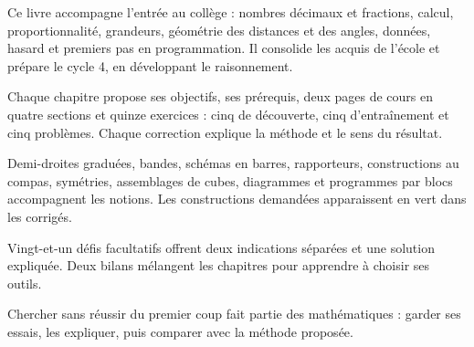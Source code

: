 \clearpage\thispagestyle{otFront}\label{avant-propos}\fontsize{11}{15}\selectfont

Ce livre accompagne l’entrée au collège : nombres décimaux et fractions,
calcul, proportionnalité, grandeurs, géométrie des distances et des angles,
données, hasard et premiers pas en programmation. Il consolide les acquis
de l’école et prépare le cycle 4, en développant le raisonnement.\par\medskip
\begin{savoirfaire}Chaque chapitre propose ses objectifs,
ses prérequis, deux pages de cours en quatre sections et quinze exercices :
cinq de découverte, cinq d’entraînement et cinq problèmes. Chaque correction
explique la méthode et le sens du résultat.\end{savoirfaire}
\begin{savoirfaire}Demi-droites graduées, bandes,
schémas en barres, rapporteurs, constructions au compas, symétries,
assemblages de cubes, diagrammes et programmes par blocs accompagnent les
notions. Les constructions demandées apparaissent en vert dans les corrigés.\end{savoirfaire}
\begin{savoirfaire}Vingt-et-un défis facultatifs offrent deux
indications séparées et une solution expliquée. Deux bilans mélangent les
chapitres pour apprendre à choisir ses outils.\end{savoirfaire}
Chercher sans réussir du premier coup fait partie des mathématiques :
garder ses essais, les expliquer, puis comparer avec la méthode proposée.

\clearpage
